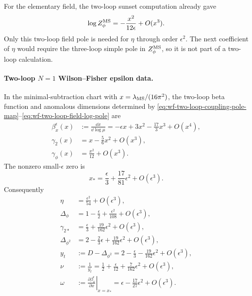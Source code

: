 For the elementary field, the two-loop sunset computation already gave
\begin{equation}
  \log Z_\phi^{\rm MS}
  =
  -\frac{x^2}{12\epsilon}+O(x^3).
  \label{eq:wf-two-loop-field-log-pole}
\end{equation}
Only this two-loop field pole is needed for \(\eta\) through order
\(\epsilon^2\).  The next coefficient of \(\eta\) would require the three-loop
simple pole in \(Z_\phi^{\rm MS}\), so it is not part of a two-loop
calculation.

\paragraph{Two-loop \(N=1\) Wilson--Fisher epsilon data.}
In the minimal-subtraction chart with \(x=\lambda_{\rm MS}/(16\pi^2)\), the
two-loop beta function and anomalous dimensions determined by
\eqref{eq:wf-two-loop-coupling-pole-map}--\eqref{eq:wf-two-loop-field-log-pole}
are
\begin{align}
  \beta_x^\epsilon(x)
  &:=
  \frac{\dd x}{\dd\log\mu}
  =
  -\epsilon x+3x^2-\frac{17}{3}x^3+O(x^4),
  \label{eq:wf-two-loop-beta-x}
  \\
  \gamma_2(x)
  &=
  x-\frac56x^2+O(x^3),
  \label{eq:wf-two-loop-gamma-two}
  \\
  \gamma_\phi(x)
  &=
  \frac{x^2}{12}+O(x^3).
  \label{eq:wf-two-loop-gamma-phi-x}
\end{align}
The nonzero small-\(\epsilon\) zero is
\begin{equation}
  x_*
  =
  \frac{\epsilon}{3}
  +\frac{17}{81}\epsilon^2
  +O(\epsilon^3).
  \label{eq:wf-two-loop-fixed-x}
\end{equation}
Consequently
\begin{align}
  \eta
  &=
  \frac{\epsilon^2}{54}+O(\epsilon^3),
  \label{eq:wf-two-loop-eta}
  \\
  \Delta_\phi
  &=
  1-\frac{\epsilon}{2}
  +\frac{\epsilon^2}{108}
  +O(\epsilon^3),
  \label{eq:wf-two-loop-delta-phi}
  \\
  \gamma_{2*}
  &=
  \frac{\epsilon}{3}
  +\frac{19}{162}\epsilon^2
  +O(\epsilon^3),
  \label{eq:wf-two-loop-gamma-two-star}
  \\
  \Delta_{\phi^2}
  &=
  2-\frac{2}{3}\epsilon
  +\frac{19}{162}\epsilon^2
  +O(\epsilon^3),
  \label{eq:wf-two-loop-delta-phi-two}
  \\
  y_t
  &:=
  D-\Delta_{\phi^2}
  =
  2-\frac{\epsilon}{3}
  -\frac{19}{162}\epsilon^2
  +O(\epsilon^3),
  \label{eq:wf-two-loop-y-t}
  \\
  \nu
  &:=
  \frac1{y_t}
  =
  \frac12+\frac{\epsilon}{12}
  +\frac{7}{162}\epsilon^2
  +O(\epsilon^3),
  \label{eq:wf-two-loop-nu}
  \\
  \omega
  &:=
  \left.\frac{\partial\beta_x^\epsilon}{\partial x}\right|_{x=x_*}
  =
  \epsilon-\frac{17}{27}\epsilon^2
  +O(\epsilon^3).
  \label{eq:wf-two-loop-omega}
\end{align}
